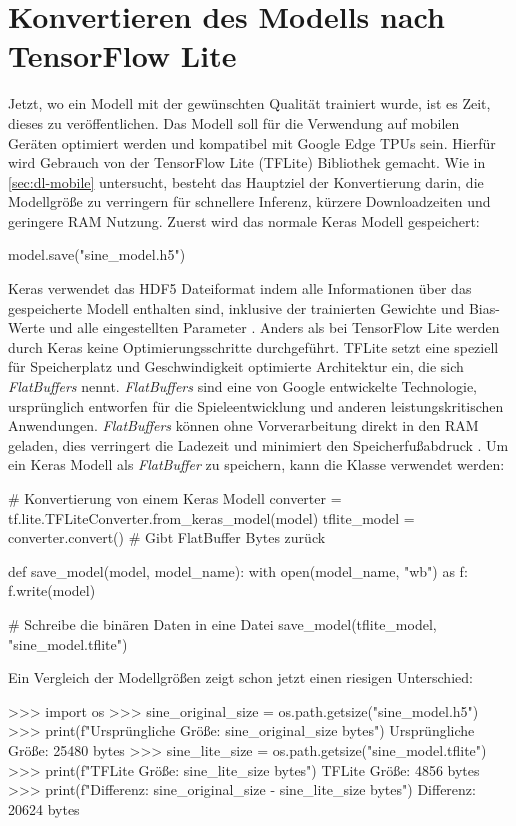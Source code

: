 \section{Konvertieren des Modells nach TensorFlow Lite}
\label{sec:convert-model}
Jetzt, wo ein Modell mit der gewünschten Qualität trainiert
wurde, ist es Zeit, dieses zu veröffentlichen.
Das Modell soll für die Verwendung auf mobilen Geräten optimiert werden
und kompatibel mit Google Edge TPUs sein.
Hierfür wird Gebrauch von der TensorFlow Lite (TFLite) Bibliothek gemacht.
Wie in \autoref{sec:dl-mobile} untersucht,
besteht das Hauptziel der Konvertierung darin, die Modellgröße zu verringern
für schnellere Inferenz, kürzere Downloadzeiten und geringere RAM Nutzung.
Zuerst wird das normale Keras Modell gespeichert:
\begin{pythoncode}
model.save("sine_model.h5")
\end{pythoncode}
Keras verwendet das HDF5 Dateiformat
indem alle Informationen über das gespeicherte Modell enthalten sind,
inklusive der trainierten Gewichte und Bias-Werte und alle eingestellten
Parameter \parencite[314]{book:hands-on-ml}.
Anders als bei TensorFlow Lite werden durch Keras keine Optimierungsschritte
durchgeführt.
TFLite setzt eine speziell für Speicherplatz und Geschwindigkeit
optimierte Architektur ein,
die sich \textit{FlatBuffers} nennt.
\textit{FlatBuffers} sind eine von Google
entwickelte Technologie, ursprünglich entworfen für die Spieleentwicklung
und anderen leistungskritischen Anwendungen.
\textit{FlatBuffers} können ohne Vorverarbeitung direkt in den RAM
geladen, dies verringert die Ladezeit
und minimiert den Speicherfußabdruck \parencite[685]{book:hands-on-ml}.
Um ein Keras Modell als \textit{FlatBuffer} zu speichern, kann die
 Klasse verwendet werden:
\begin{pythoncode}
# Konvertierung von einem Keras Modell
converter = tf.lite.TFLiteConverter.from_keras_model(model)
tflite_model = converter.convert() # Gibt FlatBuffer Bytes zurück

def save_model(model, model_name):
    with open(model_name, "wb") as f:
        f.write(model)

# Schreibe die binären Daten in eine Datei
save_model(tflite_model, "sine_model.tflite")
\end{pythoncode}
Ein Vergleich der Modellgrößen zeigt schon jetzt einen riesigen Unterschied:
\begin{pyconcode}
>>> import os
>>> sine_original_size = os.path.getsize("sine_model.h5")
>>> print(f"Ursprüngliche Größe: {sine_original_size} bytes")
Ursprüngliche Größe: 25480 bytes
>>> sine_lite_size = os.path.getsize("sine_model.tflite")
>>> print(f"TFLite Größe: {sine_lite_size} bytes")
TFLite Größe: 4856 bytes
>>> print(f"Differenz: {sine_original_size - sine_lite_size} bytes")
Differenz: 20624 bytes
\end{pyconcode}
